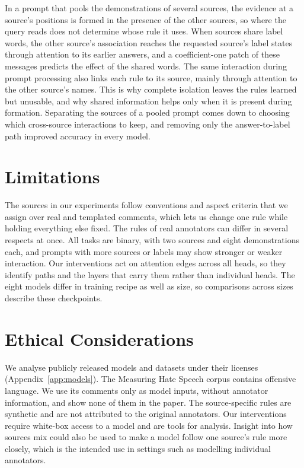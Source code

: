 \documentclass[11pt]{article}
\begin{document}
In a prompt that pools the demonstrations of several sources, the evidence at a source's positions is formed in the presence of the other sources, so where the query reads does not determine whose rule it uses.
When sources share label words, the other source's association reaches the requested source's label states through attention to its earlier answers, and a coefficient-one patch of these messages predicts the effect of the shared words.
The same interaction during prompt processing also links each rule to its source, mainly through attention to the other source's names.
This is why complete isolation leaves the rules learned but unusable, and why shared information helps only when it is present during formation.
Separating the sources of a pooled prompt comes down to choosing which cross-source interactions to keep, and removing only the answer-to-label path improved accuracy in every model.

\section*{Limitations}

The sources in our experiments follow conventions and aspect criteria that we assign over real and templated comments, which lets us change one rule while holding everything else fixed. The rules of real annotators can differ in several respects at once.
All tasks are binary, with two sources and eight demonstrations each, and prompts with more sources or labels may show stronger or weaker interaction.
Our interventions act on attention edges across all heads, so they identify paths and the layers that carry them rather than individual heads.
The eight models differ in training recipe as well as size, so comparisons across sizes describe these checkpoints.

\section*{Ethical Considerations}

We analyse publicly released models and datasets under their licenses (Appendix~\ref{app:models}).
The Measuring Hate Speech corpus contains offensive language. We use its comments only as model inputs, without annotator information, and show none of them in the paper.
The source-specific rules are synthetic and are not attributed to the original annotators.
Our interventions require white-box access to a model and are tools for analysis. Insight into how sources mix could also be used to make a model follow one source's rule more closely, which is the intended use in settings such as modelling individual annotators.



\appendix
\setcounter{dbltopnumber}{3}
\setcounter{topnumber}{3}
\renewcommand{\dbltopfraction}{0.95}
\renewcommand{\topfraction}{0.95}
\renewcommand{\textfraction}{0.05}
\renewcommand{\dblfloatpagefraction}{0.85}
\renewcommand{\floatpagefraction}{0.85}

\end{document}

